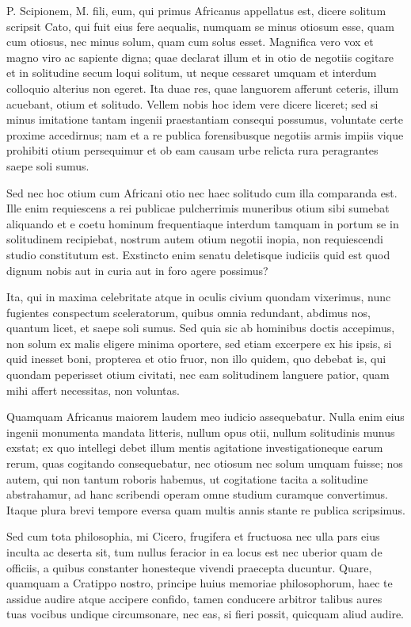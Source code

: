  P. Scipionem, M. fili, eum, qui primus Africanus appellatus est, dicere solitum scripsit Cato, qui fuit eius fere aequalis, numquam se minus otiosum esse, quam cum otiosus, nec minus solum, quam cum solus esset. Magnifica vero vox et magno viro ac sapiente digna; quae declarat illum et in otio de negotiis cogitare et in solitudine secum loqui solitum, ut neque cessaret umquam et interdum colloquio alterius non egeret. Ita duae res, quae languorem afferunt ceteris, illum acuebant, otium et solitudo. Vellem nobis hoc idem vere dicere liceret; sed si minus imitatione tantam ingenii praestantiam consequi possumus, voluntate certe proxime accedirnus; nam et a re publica forensibusque negotiis armis impiis vique prohibiti otium persequimur et ob eam causam urbe relicta rura peragrantes saepe soli sumus.

 Sed nec hoc otium cum Africani otio nec haec solitudo cum illa comparanda est. Ille enim requiescens a rei publicae pulcherrimis muneribus otium sibi sumebat aliquando et e coetu hominum frequentiaque interdum tamquam in portum se in solitudinem recipiebat, nostrum autem otium negotii inopia, non requiescendi studio constitutum est. Exstincto enim senatu deletisque iudiciis quid est quod dignum nobis aut in curia aut in foro agere possimus?

 Ita, qui in maxima celebritate atque in oculis civium quondam vixerimus, nunc fugientes conspectum sceleratorum, quibus omnia redundant, abdimus nos, quantum licet, et saepe soli sumus. Sed quia sic ab hominibus doctis accepimus, non solum ex malis eligere minima oportere, sed etiam excerpere ex his ipsis, si quid inesset boni, propterea et otio fruor, non illo quidem, quo debebat is, qui quondam peperisset otium civitati, nec eam solitudinem languere patior, quam mihi affert necessitas, non voluntas.

 Quamquam Africanus maiorem laudem meo iudicio assequebatur. Nulla enim eius ingenii monumenta mandata litteris, nullum opus otii, nullum solitudinis munus exstat; ex quo intellegi debet illum mentis agitatione investigationeque earum rerum, quas cogitando consequebatur, nec otiosum nec solum umquam fuisse; nos autem, qui non tantum roboris habemus, ut cogitatione tacita a solitudine abstrahamur, ad hanc scribendi operam omne studium curamque convertimus. Itaque plura brevi tempore eversa quam multis annis stante re publica scripsimus.

 Sed cum tota philosophia, mi Cicero, frugifera et fructuosa nec ulla pars eius inculta ac deserta sit, tum nullus feracior in ea locus est nec uberior quam de officiis, a quibus constanter honesteque vivendi praecepta ducuntur. Quare, quamquam a Cratippo nostro, principe huius memoriae philosophorum, haec te assidue audire atque accipere confido, tamen conducere arbitror talibus aures tuas vocibus undique circumsonare, nec eas, si fieri possit, quicquam aliud audire.

